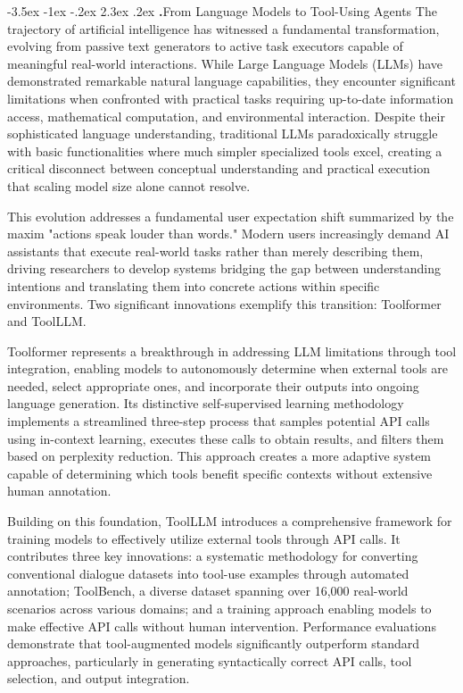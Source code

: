 \documentclass[journal,twoside,10pt]{IEEEtran}
\makeatletter
\renewcommand\section{\@startsection{section}{1}{\z@}%
                       {-3.5ex \@plus -1ex \@minus -.2ex}%
                       {2.3ex \@plus.2ex}%
                       {\normalfont\Large\bfseries\Roman{section}.\quad}}
\makeatother
\begin{document}
\section{From Language Models to Tool-Using Agents}
The trajectory of artificial intelligence has witnessed a fundamental transformation, evolving from passive text generators to active task executors capable of meaningful real-world interactions. While Large Language Models (LLMs) have demonstrated remarkable natural language capabilities, they encounter significant limitations when confronted with practical tasks requiring up-to-date information access, mathematical computation, and environmental interaction. Despite their sophisticated language understanding, traditional LLMs paradoxically struggle with basic functionalities where much simpler specialized tools excel, creating a critical disconnect between conceptual understanding and practical execution that scaling model size alone cannot resolve.

This evolution addresses a fundamental user expectation shift summarized by the maxim "actions speak louder than words." Modern users increasingly demand AI assistants that execute real-world tasks rather than merely describing them, driving researchers to develop systems bridging the gap between understanding intentions and translating them into concrete actions within specific environments. Two significant innovations exemplify this transition: Toolformer and ToolLLM.

Toolformer represents a breakthrough in addressing LLM limitations through tool integration, enabling models to autonomously determine when external tools are needed, select appropriate ones, and incorporate their outputs into ongoing language generation. Its distinctive self-supervised learning methodology implements a streamlined three-step process that samples potential API calls using in-context learning, executes these calls to obtain results, and filters them based on perplexity reduction. This approach creates a more adaptive system capable of determining which tools benefit specific contexts without extensive human annotation.

Building on this foundation, ToolLLM introduces a comprehensive framework for training models to effectively utilize external tools through API calls. It contributes three key innovations: a systematic methodology for converting conventional dialogue datasets into tool-use examples through automated annotation; ToolBench, a diverse dataset spanning over 16,000 real-world scenarios across various domains; and a training approach enabling models to make effective API calls without human intervention. Performance evaluations demonstrate that tool-augmented models significantly outperform standard approaches, particularly in generating syntactically correct API calls, tool selection, and output integration.
\end{document}
